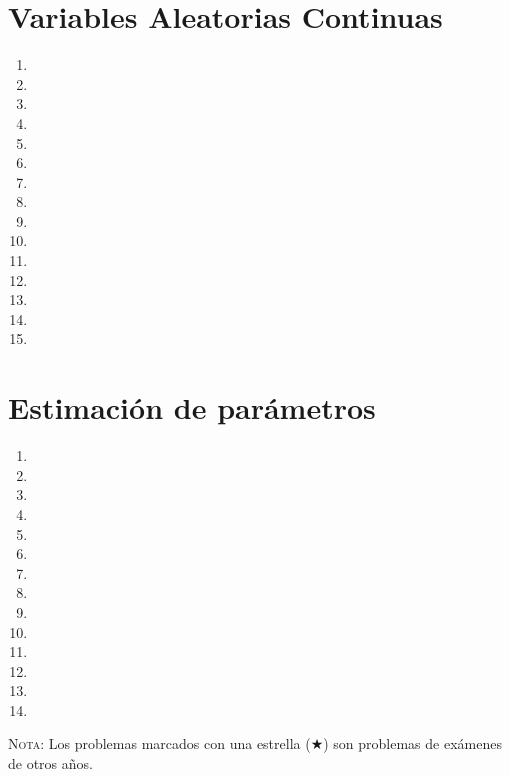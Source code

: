 \documentclass[a4paper,titlepage]{article}
\begin{document}
\section{Variables Aleatorias Continuas}
\begin{enumerate}[leftmargin=*,resume]
\item {}
\item {}
\item {}
\item {}
\item {}
\item {}
\item {}
\item {}
\item {}
\item {}
\item {}
\item {}
\item {}
\item {}
\item {}
\end{enumerate}

\section{Estimación de parámetros}
\begin{enumerate}[leftmargin=*,resume]
\item {}
\item {}
\item {}
\item {}
\item {}
\item {}
\item {}
\item {}
\item {}
\item {}
\item {}
\item {}
\item {}
\item {}
\end{enumerate}

\vspace{2cm}

\textsc{Nota}: Los problemas marcados con una estrella ($\bigstar$) son problemas de
exámenes de otros años.
\end{document}

